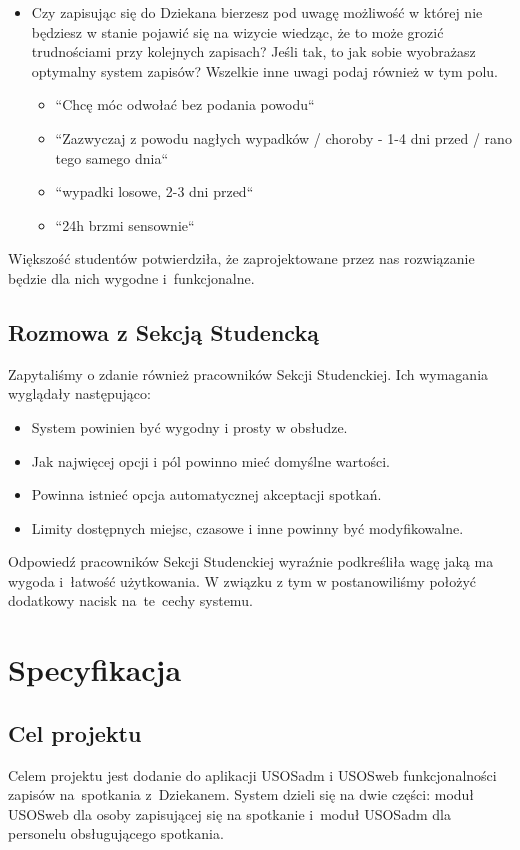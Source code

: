\documentclass[licencjacka]{pracamgr}
\begin{document}
\begin{itemize}
\item Czy zapisując się do Dziekana bierzesz pod uwagę możliwość w której nie będziesz w stanie pojawić się na wizycie wiedząc, że to może grozić trudnościami przy kolejnych zapisach? Jeśli tak, to jak sobie wyobrażasz optymalny system zapisów? Wszelkie inne uwagi podaj również w tym polu.
\begin{itemize}
\setlength\itemsep{0,05em}
\item ``Chcę móc odwołać bez podania powodu``
\item ``Zazwyczaj z powodu nagłych wypadków / choroby - 1-4 dni przed / rano tego samego dnia``
\item ``wypadki losowe, 2-3 dni przed``
\item ``24h brzmi sensownie``
\end{itemize}

\end{itemize}
Większość studentów potwierdziła, że zaprojektowane przez nas rozwiązanie będzie dla nich wygodne i~funkcjonalne.
 
\section{Rozmowa z Sekcją Studencką}
Zapytaliśmy o zdanie również pracowników Sekcji Studenckiej. Ich wymagania wyglądały następująco:
\begin{itemize}
\setlength\itemsep{0,05em}
    \item System powinien być wygodny i prosty w obsłudze.
    \item Jak najwięcej opcji i pól powinno mieć domyślne wartości.
    \item Powinna istnieć opcja automatycznej akceptacji spotkań.
    \item Limity dostępnych miejsc, czasowe i inne powinny być modyfikowalne.
\end{itemize}
Odpowiedź pracowników Sekcji Studenckiej wyraźnie podkreśliła wagę jaką ma wygoda i~łatwość użytkowania. W związku z tym w postanowiliśmy położyć dodatkowy nacisk na~te~cechy systemu.


\chapter{Specyfikacja} \label{chap:specyfikacja}

\section{Cel projektu}
Celem projektu jest dodanie do aplikacji USOSadm i USOSweb funkcjonalności zapisów na~spotkania z~Dziekanem. System dzieli się na dwie części: moduł USOSweb dla osoby zapisującej się na spotkanie i~moduł USOSadm dla personelu obsługującego spotkania.
 
\end{document}

